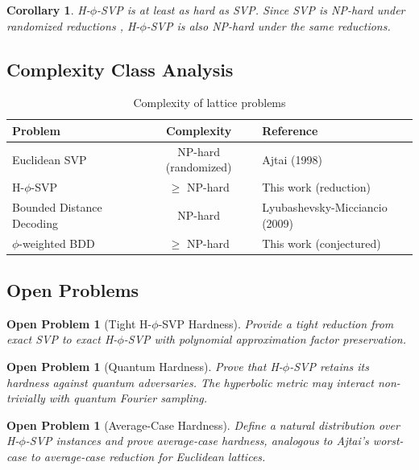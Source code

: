 \documentclass[11pt,a4paper]{article}
\newtheorem{corollary}[theorem]{Corollary}
\newtheorem{openproblem}[theorem]{Open Problem}
\theoremstyle{remark}
\begin{document}
\begin{corollary}
H-$\phi$-SVP is at least as hard as SVP. Since SVP is NP-hard under randomized reductions \cite{ajtai1998}, H-$\phi$-SVP is also NP-hard under the same reductions.
\end{corollary}

\subsection{Complexity Class Analysis}

\begin{table}[H]
\centering
\begin{tabular}{lcl}
\toprule
\textbf{Problem} & \textbf{Complexity} & \textbf{Reference} \\
\midrule
Euclidean SVP & NP-hard (randomized) & Ajtai (1998) \cite{ajtai1998} \\
H-$\phi$-SVP & $\geq$ NP-hard & This work (reduction) \\
Bounded Distance Decoding & NP-hard & Lyubashevsky-Micciancio (2009) \\
$\phi$-weighted BDD & $\geq$ NP-hard & This work (conjectured) \\
\bottomrule
\end{tabular}
\caption{Complexity of lattice problems}
\end{table}

\subsection{Open Problems}

\begin{openproblem}[Tight H-$\phi$-SVP Hardness]
Provide a tight reduction from exact SVP to exact H-$\phi$-SVP with polynomial approximation factor preservation.
\end{openproblem}

\begin{openproblem}[Quantum Hardness]
Prove that H-$\phi$-SVP retains its hardness against quantum adversaries. The hyperbolic metric may interact non-trivially with quantum Fourier sampling.
\end{openproblem}

\begin{openproblem}[Average-Case Hardness]
Define a natural distribution over H-$\phi$-SVP instances and prove average-case hardness, analogous to Ajtai's worst-case to average-case reduction for Euclidean lattices.
\end{openproblem}
\end{document}
